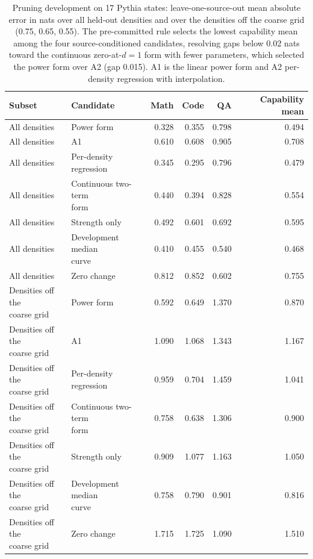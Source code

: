 \begin{table}[!htbp]\normalfont\centering\footnotesize
\begin{tabular*}{\textwidth}{@{\extracolsep{\fill}}llrrrr@{}}
\toprule
Subset & Candidate & Math & Code & QA & Capability mean \\
\midrule
All densities & Power form & 0.328 & 0.355 & 0.798 & 0.494 \\
All densities & A1 & 0.610 & 0.608 & 0.905 & 0.708 \\
All densities & \shortstack[l]{Per-density\\regression} & 0.345 & 0.295 & 0.796 & 0.479 \\
All densities & \shortstack[l]{Continuous two-term\\form} & 0.440 & 0.394 & 0.828 & 0.554 \\
All densities & Strength only & 0.492 & 0.601 & 0.692 & 0.595 \\
All densities & \shortstack[l]{Development median\\curve} & 0.410 & 0.455 & 0.540 & 0.468 \\
All densities & Zero change & 0.812 & 0.852 & 0.602 & 0.755 \\
\shortstack[l]{Densities off the\\coarse grid} & Power form & 0.592 & 0.649 & 1.370 & 0.870 \\
\shortstack[l]{Densities off the\\coarse grid} & A1 & 1.090 & 1.068 & 1.343 & 1.167 \\
\shortstack[l]{Densities off the\\coarse grid} & \shortstack[l]{Per-density\\regression} & 0.959 & 0.704 & 1.459 & 1.041 \\
\shortstack[l]{Densities off the\\coarse grid} & \shortstack[l]{Continuous two-term\\form} & 0.758 & 0.638 & 1.306 & 0.900 \\
\shortstack[l]{Densities off the\\coarse grid} & Strength only & 0.909 & 1.077 & 1.163 & 1.050 \\
\shortstack[l]{Densities off the\\coarse grid} & \shortstack[l]{Development median\\curve} & 0.758 & 0.790 & 0.901 & 0.816 \\
\shortstack[l]{Densities off the\\coarse grid} & Zero change & 1.715 & 1.725 & 1.090 & 1.510 \\
\bottomrule\end{tabular*}
\caption{Pruning development on 17 Pythia states: leave-one-source-out mean absolute error in nats over all \mbox{held-out} densities and over the densities off the coarse grid (0.75, 0.65, 0.55). The \mbox{pre-committed} rule selects the lowest capability mean among the four source-conditioned candidates, resolving gaps below 0.02 nats toward the continuous zero-at-$d{=}1$ form with fewer parameters, which selected the power form over A2 (gap 0.015). A1 is the linear power form and A2 per-density regression with interpolation.}
\label{tab:v53_loso}\end{table}
